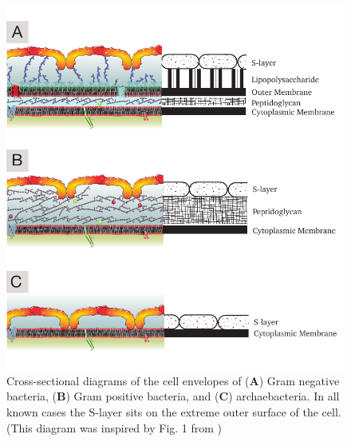         \begin{figure}[p] %
                \begin{center}
                    \includegraphics[]{intro/img/celwalls.pdf}
                \end{center}
                \caption[Cross-sectional diagrams of the cell envelopes]{Cross-sectional diagrams of the cell envelopes of (\textbf{A}) Gram negative bacteria, (\textbf{B}) Gram positive bacteria, and (\textbf{C}) archaebacteria. In all known cases the \ac{S-layer} sits on the extreme outer surface of the cell. (This diagram was inspired by Fig. 1 from )}
                \label{fig:cellwalls}
        \end{figure}

